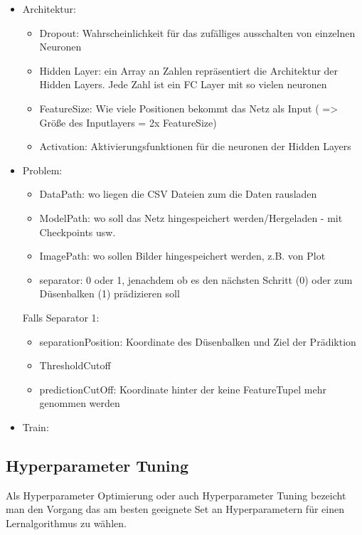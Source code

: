 \begin{itemize}
\item Architektur:
    \begin{itemize}
        \item Dropout: Wahrscheinlichkeit für das zufälliges ausschalten von einzelnen Neuronen
        \item Hidden Layer: ein Array an Zahlen repräsentiert die Architektur der Hidden Layers. Jede Zahl ist ein FC Layer mit so vielen neuronen
        \item FeatureSize: Wie viele Positionen bekommt das Netz als Input ( => Größe des Inputlayers = 2x FeatureSize)
        \item Activation: Aktivierungsfunktionen für die neuronen der Hidden Layers
    \end{itemize}
\item Problem:
    \begin{itemize}
        \item DataPath: wo liegen die CSV Dateien zum die Daten rausladen
        \item ModelPath: wo soll das Netz hingespeichert werden/Hergeladen - mit Checkpoints usw.
        \item ImagePath: wo sollen Bilder hingespeichert werden, z.B. von Plot
        \item separator: 0 oder 1, jenachdem ob es den nächsten Schritt (0) oder zum Düsenbalken (1) prädizieren soll
    \end{itemize}

    Falls Separator 1:
    \begin{itemize}
        \item separationPosition: Koordinate des Düsenbalken und Ziel der Prädiktion
        \item ThresholdCutoff 
        \item predictionCutOff: Koordinate hinter der keine FeatureTupel mehr genommen werden
    \end{itemize}
\item Train:

\end{itemize}


\subsection{Hyperparameter Tuning}

Als Hyperparameter Optimierung oder auch Hyperparameter Tuning bezeicht man den Vorgang das am besten geeignete Set an 
Hyperparametern für einen Lernalgorithmus zu wählen.



